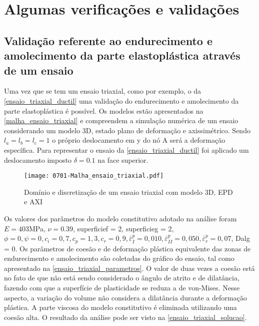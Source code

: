 \chapter{Algumas verificações e validações}\label{Algumas_verificacoes_validacoes}

\section{Validação referente ao endurecimento e amolecimento da parte elastoplástica através de um ensaio}

Uma vez que se tem um ensaio triaxial, como por exemplo, o da \autoref{ensaio_triaxial_ductil} uma validação do endurecimento e amolecimento da parte elastoplástica é possível. Os modelos estão apresentados na \autoref{malha_ensaio_triaxial} e compreendem a simulação numérica de um ensaio considerando um modelo 3D, estado plano de deformação e axissimétrico. Sendo $l_a = l_b = l_c = 1$ o próprio deslocamento em y do nó A será a deformação específica. Para representar o ensaio da \autoref{ensaio_triaxial_ductil} foi aplicado um deslocamento imposto $\delta = 0.1$ na face superior.

\begin{figure}[H]
	\begin{center}
		\texttt{[image: 0701-Malha\_ensaio\_triaxial.pdf]}
	\end{center}
	\caption{\label{malha_ensaio_triaxial}Domínio e discretização de um ensaio triaxial com modelo 3D, EPD e AXI}
\end{figure}

Os valores dos parâmetros do modelo constitutivo adotado na análise foram $E = 403$MPa, $\nu = 0.39$,  superficief = 2, superficieg = 2, $\phi = 0, \psi = 0, c_i = 0,7, c_p = 1,3, c_r = 0,9, \bar \varepsilon^p_{I} = 0,010, \bar \varepsilon^p_{II} = 0,050, \bar \varepsilon^p_{r} = 0,07$, Dalg = 0. Os parâmetros de coesão e de deformação plástica equivalente das zonas de endurecimento e amolecimento são coletadas do gráfico do ensaio, tal como apresentado na \autoref{ensaio_triaxial_parametros}. O valor de duas vezes a coesão está no fato de que não está sendo considerado o ângulo de atrito e de dilatância, fazendo com que a superfície de plasticidade se reduza a de von-Mises. Nesse aspecto, a variação do volume não considera a dilatância durante a deformação plástica. A parte viscosa do modelo constitutivo é eliminada utilizando uma coesão alta. O resultado da análise pode ser visto na \autoref{ensaio_triaxial_solucao}.
 

